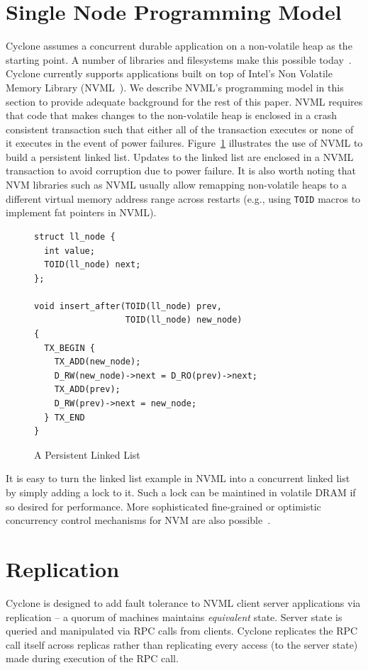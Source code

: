 \documentclass[letterpaper,twocolumn,10pt]{article}
\begin{document}
\section{Single Node Programming Model}
Cyclone assumes a concurrent durable application on a non-volatile heap as the
starting point. A number of libraries and filesystems make this possible
today~\cite{nvml, dax, pmfs, mnemosyne, nvheaps, cdds}. Cyclone currently
supports applications built on top of Intel's Non Volatile Memory Library
(NVML~\cite{nvml}). We describe NVML's programming model in this section to
provide adequate background for the rest of this paper. NVML requires 
that code that makes changes to the non-volatile heap is enclosed in a crash
consistent transaction such that either all of the transaction executes or none
of it executes in the event of power failures.
Figure~\ref{fig:example} illustrates the use of NVML to build a persistent
linked list. Updates to the linked list are enclosed in a NVML transaction to
avoid corruption due to power failure. It is also worth noting that NVM
libraries such as NVML usually allow remapping non-volatile heaps to a different
virtual memory address range across restarts (e.g., using {\tt TOID} macros to
implement fat pointers in NVML).

\begin{figure}
  { \scriptsize
\begin{verbatim}
struct ll_node {
  int value;
  TOID(ll_node) next;
};

void insert_after(TOID(ll_node) prev, 
                  TOID(ll_node) new_node)
{
  TX_BEGIN {
    TX_ADD(new_node);
    D_RW(new_node)->next = D_RO(prev)->next;
    TX_ADD(prev);
    D_RW(prev)->next = new_node;
  } TX_END
}

\end{verbatim}
  }
\caption{A Persistent Linked List}
\label{fig:example}
\end{figure}

It is easy to turn the linked list example in NVML into a concurrent linked list
by simply adding a lock to it. Such a lock can be maintined in volatile DRAM if
so desired for performance. More sophisticated fine-grained or optimistic
concurrency control mechanisms for NVM are also
possible~\cite{mnemosyne, cdds, nvheaps}.

\section{Replication}
Cyclone is designed to add fault tolerance to NVML client server applications
via replication -- a quorum of machines maintains \emph{equivalent} state.
Server state is queried and manipulated via RPC calls from clients.
Cyclone replicates the RPC call itself across replicas rather than replicating
every access (to the server state) made during execution of the RPC call.
\end{document}
